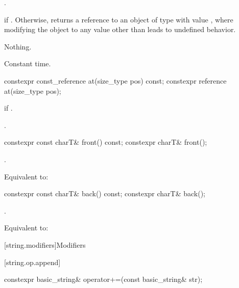\begin{itemdescr}
\pnum
\expects
{}.

\pnum
\returns
{} if . Otherwise,
returns a reference to an object of type  with value
, where modifying the object to any value other than
 leads to undefined behavior.

\pnum
\throws
Nothing.

\pnum
\complexity
Constant time.
\end{itemdescr}

%
\begin{itemdecl}
constexpr const_reference at(size_type pos) const;
constexpr reference       at(size_type pos);
\end{itemdecl}

\begin{itemdescr}
\pnum
\throws
{}
if
.

\pnum
\returns
{}.
\end{itemdescr}

%
\begin{itemdecl}
constexpr const charT& front() const;
constexpr charT& front();
\end{itemdecl}

\begin{itemdescr}
\pnum
\expects
{}.

\pnum
\effects
Equivalent to: 
\end{itemdescr}

%
\begin{itemdecl}
constexpr const charT& back() const;
constexpr charT& back();
\end{itemdecl}

\begin{itemdescr}
\pnum
\expects
{}.

\pnum
\effects
Equivalent to: 
\end{itemdescr}

[string.modifiers]{Modifiers}

[string.op.append]{}

%
\begin{itemdecl}
constexpr basic_string& operator+=(const basic_string& str);
\end{itemdecl}

